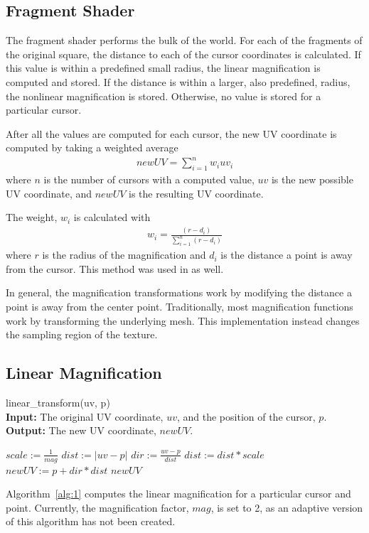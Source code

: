 \documentclass[annual]{acmsiggraph}
\begin{document}
\subsection{Fragment Shader}
The fragment shader performs the bulk of the world. For each of the fragments of
the original square, the distance to each of the cursor coordinates is calculated.
If this value is within a predefined small radius, the linear magnification is
computed and stored. If the distance is within a larger, also predefined, radius,
the nonlinear magnification is stored. Otherwise, no value is stored for a
particular cursor.

After all the values are computed for each cursor, the new UV coordinate
is computed by taking a weighted average
\begin{align*}
    newUV = \sum_{i=1}^{n}w_iuv_i
\end{align*}
where $n$ is the number of cursors with a computed value, $uv$ is the 
new possible UV coordinate, and $newUV$ is the resulting UV coordinate.

The weight, $w_i$ is calculated with
\begin{align*}
    w_i = \frac{(r-d_i)}{\sum_{i=1}^{n}(r-d_i)}
\end{align*}
where $r$ is the radius of the magnification and $d_i$ is the distance
a point is away from the cursor. This method was used in \cite{96} as well.

In general, the magnification transformations work by modifying the distance 
a point is away from the center point. Traditionally, most magnification
functions work by transforming the underlying mesh. This implementation
instead changes the sampling region of the texture.

\subsection{Linear Magnification}
\begin{algorithm}
\caption{linear\_transform(uv, p)\\
\textbf{Input:} The original UV coordinate, $uv$, and the position of the cursor, $p$. \\
\textbf{Output:} The new UV coordinate, $newUV$.}
\label{alg:1}
\begin{algorithmic}
    \State $scale := \frac{1}{ mag }$
    \State $dist := \left|uv - p\right|$
    \State $dir := \frac{uv - p}{dist}$
    \State $dist := dist * scale$
    \State $newUV := p + dir * dist$
    \State \Return $newUV$
\end{algorithmic}
\end{algorithm}
Algorithm~\ref{alg:1} computes the linear magnification for a 
particular cursor and point. Currently, the magnification factor, $mag$,
is set to 2, as an adaptive version of this algorithm has not been created.
\end{document}
